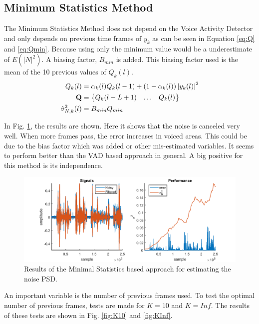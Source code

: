 \subsection{Minimum Statistics Method}
The Minimum Statistics Method does not depend on the Voice Activity Detector and only depends on previous time frames of $y_{k}$ as can be seen in Equation \ref{eq:Q} and \ref{eq:Qmin}. Because using only the minimum value would be a underestimate of $E(|N|^2)$. A biasing factor, $B_{min}$ is added. This biasing factor used is the mean of the 10 previous values of $Q_k(l)$.
\begin{align}
Q_{k}(l) &= \alpha_k(l)Q_k(l-1)+(1-\alpha_k(l))\abs{y_{k}(l)}^{2}\label{eq:Qk} \\
  \mathbf{Q} &=
  \begin{Bmatrix}
    Q_{k}(l-L+1) & \hdots & Q_{k}(l)
  \end{Bmatrix}
  \label{eq:Q} \\
  \hat \sigma_{N,k}^{2}(l) &= B_{min}Q_{min}
  \label{eq:Qmin}\\
\end{align}

In Fig. \ref{fig:minstatnoise}, the results are shown. Here it shows that the noise is canceled very well. When more frames pass, the error increases in voiced areas. This could be due to the bias factor which was added or other mis-estimated variables. It seems to perform better than the VAD based approach in general. A big positive for this method is its independence.

\begin{figure}
  \centering
  \includegraphics[width=\textwidth]{images/msmethod.png}
  \caption{Results of the Minimal Statistics based approach for estimating the noise PSD.}
  \label{fig:minstatnoise}
\end{figure}

An important variable is the number of previous frames used. To test the optimal number of previous frames, tests are made for $K=10$ and $K=Inf$. The results of these tests are shown in Fig. \ref{fig:K10} and \ref{fig:KInf}.

